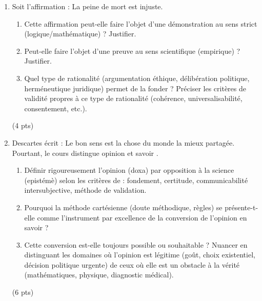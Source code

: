 \documentclass[11pt]{article}
\begin{document}
\begin{exercice}
\begin{enumerate}
    \item Soit l'affirmation : \og La peine de mort est injuste. \fg{} 
    \begin{enumerate}
        \item Cette affirmation peut-elle faire l'objet d'une \og démonstration \fg{} au sens strict (logique/mathématique) ? Justifier.
        \item Peut-elle faire l'objet d'une \og preuve \fg{} au sens scientifique (empirique) ? Justifier.
        \item Quel type de rationalité (argumentation éthique, délibération politique, herméneutique juridique) permet de la fonder ? Préciser les critères de validité propres à ce type de rationalité (cohérence, universalisabilité, consentement, etc.). 
    \end{enumerate} (4 pts)
    \item Descartes écrit : \og Le bon sens est la chose du monde la mieux partagée. \fg{} Pourtant, le cours distingue \og opinion \fg{} et \og savoir \fg{}. 
    \begin{enumerate}
        \item Définir rigoureusement l'opinion (doxa) par opposition à la science (epistémè) selon les critères de : fondement, certitude, communicabilité intersubjective, méthode de validation.
        \item Pourquoi la méthode cartésienne (doute méthodique, règles) se présente-t-elle comme l'instrument par excellence de la \og conversion \fg{} de l'opinion en savoir ? 
        \item Cette conversion est-elle toujours possible ou souhaitable ? Nuancer en distinguant les domaines où l'opinion est légitime (goût, choix existentiel, décision politique urgente) de ceux où elle est un obstacle à la vérité (mathématiques, physique, diagnostic médical). 
    \end{enumerate} (6 pts)
\end{enumerate}
\end{exercice}
\end{document}
